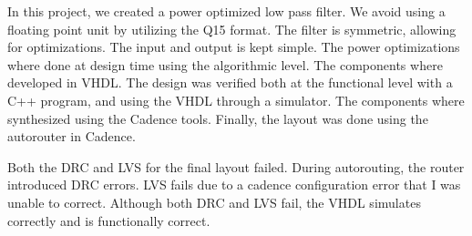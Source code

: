 

In this project, we created a power optimized low pass filter.  We avoid using a floating point unit by utilizing the Q15 format.  The filter is symmetric, allowing for optimizations.  The input and output is kept simple.    The power optimizations where done at design time using the algorithmic level.  The components where developed in VHDL.  The design was verified both at the functional level with a C++ program, and using the VHDL through a simulator.  The components where synthesized using the Cadence tools.  Finally, the layout was done using the autorouter in Cadence.

Both the DRC and LVS for the final layout failed.  During autorouting, the router introduced DRC errors.  LVS fails due to a cadence configuration error that I was unable to correct.  Although both DRC and LVS fail, the VHDL simulates correctly and is functionally correct.  

